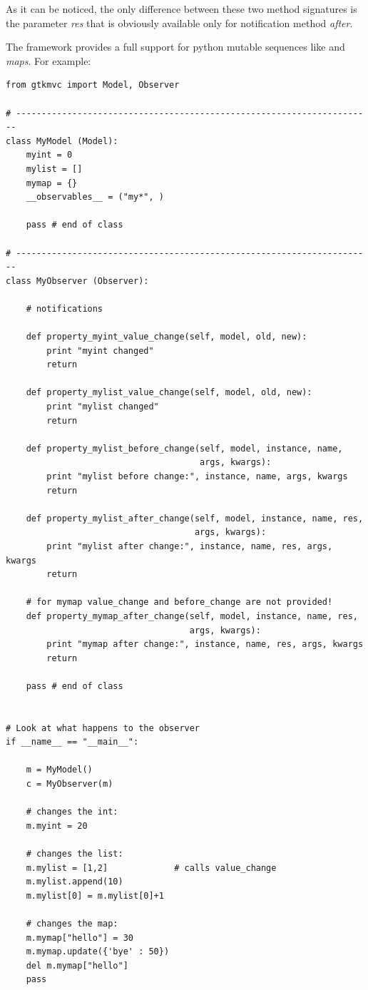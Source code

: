 As it can be noticed, the only difference between these two method
signatures is the parameter \emph{res} that is obviously available only
for notification method \emph{after}.

The framework \mvco provides a full support for python mutable
sequences like  and \emph{maps}. For example:


{ \codesize 
\begin{verbatim} 
from gtkmvc import Model, Observer

# ----------------------------------------------------------------------
class MyModel (Model): 
    myint = 0
    mylist = []
    mymap = {}
    __observables__ = ("my*", )

    pass # end of class

# ----------------------------------------------------------------------
class MyObserver (Observer):

    # notifications

    def property_myint_value_change(self, model, old, new):
        print "myint changed"
        return

    def property_mylist_value_change(self, model, old, new):
        print "mylist changed"
        return

    def property_mylist_before_change(self, model, instance, name,
                                      args, kwargs):
        print "mylist before change:", instance, name, args, kwargs
        return

    def property_mylist_after_change(self, model, instance, name, res,
                                     args, kwargs):
        print "mylist after change:", instance, name, res, args, kwargs
        return

    # for mymap value_change and before_change are not provided!
    def property_mymap_after_change(self, model, instance, name, res,
                                    args, kwargs):
        print "mymap after change:", instance, name, res, args, kwargs
        return

    pass # end of class


# Look at what happens to the observer
if __name__ == "__main__":

    m = MyModel()
    c = MyObserver(m)

    # changes the int:
    m.myint = 20

    # changes the list:
    m.mylist = [1,2]             # calls value_change
    m.mylist.append(10)     
    m.mylist[0] = m.mylist[0]+1

    # changes the map:
    m.mymap["hello"] = 30
    m.mymap.update({'bye' : 50})
    del m.mymap["hello"]
    pass
\end{verbatim}
}

